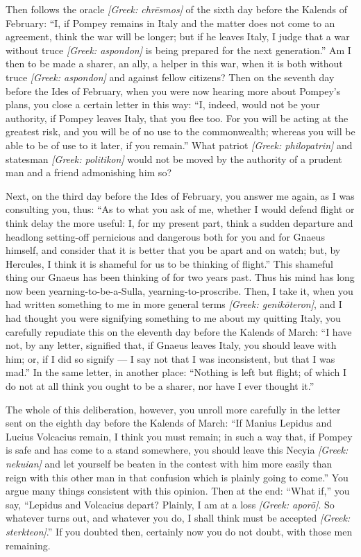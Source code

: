  Then follows the oracle \textit{[Greek: chr\=esmos]} of the sixth day before the Kalends of February: ``I, if Pompey remains in Italy and the matter does not come to an agreement, think the war will be longer; but if he leaves Italy, I judge that a war without truce \textit{[Greek: aspondon]} is being prepared for the next generation.'' Am I then to be made a sharer, an ally, a helper in this war, when it is both without truce \textit{[Greek: aspondon]} and against fellow citizens? Then on the seventh day before the Ides of February, when you were now hearing more about Pompey's plans, you close a certain letter in this way: ``I, indeed, would not be your authority, if Pompey leaves Italy, that you flee too. For you will be acting at the greatest risk, and you will be of no use to the commonwealth; whereas you will be able to be of use to it later, if you remain.'' What patriot \textit{[Greek: philopatrin]} and statesman \textit{[Greek: politikon]} would not be moved by the authority of a prudent man and a friend admonishing him so?

 Next, on the third day before the Ides of February, you answer me again, as I was consulting you, thus: ``As to what you ask of me, whether I would defend flight or think delay the more useful: I, for my present part, think a sudden departure and headlong setting-off pernicious and dangerous both for you and for Gnaeus himself, and consider that it is better that you be apart and on watch; but, by Hercules, I think it is shameful for us to be thinking of flight.'' This shameful thing our Gnaeus has been thinking of for two years past. Thus his mind has long now been yearning-to-be-a-Sulla, yearning-to-proscribe. Then, I take it, when you had written something to me in more general terms \textit{[Greek: genik\=oteron]}, and I had thought you were signifying something to me about my quitting Italy, you carefully repudiate this on the eleventh day before the Kalends of March: ``I have not, by any letter, signified that, if Gnaeus leaves Italy, you should leave with him; or, if I did so signify --- I say not that I was inconsistent, but that I was mad.'' In the same letter, in another place: ``Nothing is left but flight; of which I do not at all think you ought to be a sharer, nor have I ever thought it.''

 The whole of this deliberation, however, you unroll more carefully in the letter sent on the eighth day before the Kalends of March: ``If Manius Lepidus and Lucius Volcacius remain, I think you must remain; in such a way that, if Pompey is safe and has come to a stand somewhere, you should leave this Necyia \textit{[Greek: nekuian]} and let yourself be beaten in the contest with him more easily than reign with this other man in that confusion which is plainly going to come.'' You argue many things consistent with this opinion. Then at the end: ``What if,'' you say, ``Lepidus and Volcacius depart? Plainly, I am at a loss \textit{[Greek: apor\=o]}. So whatever turns out, and whatever you do, I shall think must be accepted \textit{[Greek: sterkteon]}.'' If you doubted then, certainly now you do not doubt, with those men remaining.

